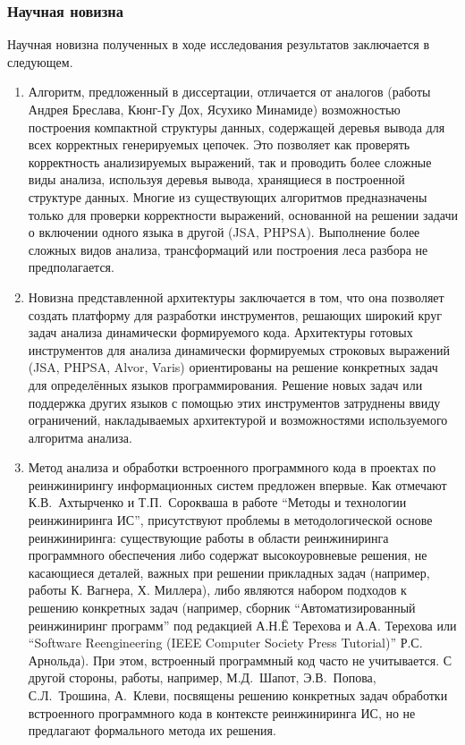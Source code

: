\subsubsection*{\large{Научная новизна}}

Научная новизна полученных в ходе исследования результатов заключается в следующем.

\begin{enumerate}

\item Алгоритм, предложенный в диссертации, отличается от аналогов (работы Андрея Бреслава, Кюнг-Гу Дох, Ясухико Минамиде) возможностью построения компактной структуры данных, содержащей деревья вывода для всех корректных генерируемых цепочек. Это позволяет как проверять корректность анализируемых выражений, так и проводить более сложные виды анализа, используя деревья вывода, хранящиеся в построенной структуре данных. Многие из существующих алгоритмов предназначены только для проверки корректности выражений, основанной на решении задачи о включении одного языка в другой (JSA, PHPSA). Выполнение более сложных видов анализа, трансформаций или построения леса разбора не предполагается. 

\item Новизна представленной архитектуры заключается в том, что она позволяет создать платформу для разработки инструментов, решающих широкий круг задач анализа динамически формируемого кода. Архитектуры готовых инструментов для анализа динамически формируемых строковых выражений (JSA, PHPSA, Alvor, Varis) ориентированы на решение конкретных задач для определённых языков программирования. Решение новых задач или поддержка других языков с помощью этих инструментов затруднены ввиду ограничений, накладываемых архитектурой и возможностями используемого алгоритма анализа. 

\item Метод анализа и обработки встроенного программного кода в проектах по реинжинирингу информационных систем предложен впервые. Как отмечают К.В.~Ахтырченко и Т.П.~Сорокваша в работе ``Методы и технологии реинжиниринга ИС'', присутствуют проблемы в методологической основе реинжиниринга: существующие работы в области реинжиниринга программного обеспечения либо содержат высокоуровневые решения, не касающиеся деталей, важных при решении прикладных задач (например, работы К. Вагнера, Х. Миллера), либо являются набором подходов к решению конкретных задач (например, сборник ``Автоматизированный реинжиниринг программ'' под редакцией А.Н.Ё Терехова и А.А. Терехова или ``Software Reengineering (IEEE Computer Society Press Tutorial)'' Р.С. Арнольда). При этом, встроенный программный код часто не учитывается. С другой стороны, работы, например, М.Д.~Шапот, Э.В.~Попова, С.Л.~Трошина, А.~Клеви,  посвящены решению конкретных задач обработки встроенного программного кода в контексте реинжиниринга ИС, но не предлагают формального метода их решения.

\end{enumerate}

